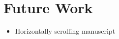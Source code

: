 \chapter{Future Work}

\begin{itemize}
  \item Horizontally scrolling manuscript
  
\end{itemize}

\clearpage
